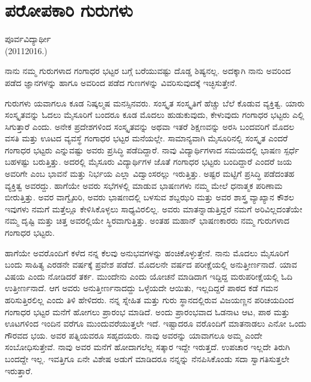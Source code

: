 {\fontsize{14}{16}\selectfont
\chapter{ಪರೋಪಕಾರಿ ಗುರುಗಳು}

\begin{center}
\smallskip
ಪೂರ್ವವಿದ್ಯಾರ್ಥೀ\\
(2011\enginline{--}2016.)
\addrule
\end{center}
ನಾನು ನಮ್ಮ ಗುರುಗಳಾದ ಗಂಗಾಧರ ಭಟ್ಟರ ಬಗ್ಗೆ ಬರೆಯುವಷ್ಟು ದೊಡ್ಡ ಶಿಷ್ಯನಲ್ಲ. ಅದಕ್ಕಾಗಿ ನಾನು ಅವರಿಂದ ಪಡೆದ ಜ್ಞಾನಗಳನ್ನು ಹಾಗೂ ಅವರಿಂದ ಪಡೆದ ಗುಣಗಳನ್ನು ವಿವರಿಸುವುದಕ್ಕೆ ಇಚ್ಛಿಸುತ್ತೇನೆ.

ಗುರುಗಳು ಯವಾಗಲೂ ಕೂಡ ನಿಷ್ಕಲ್ಮಷ ಮನಸ್ಸಿನವರು. ಸಂಸ್ಕೃತ ಸಂಸ್ಕೃತಿಗೆ ಹೆಚ್ಚು ಬೆಲೆ ಕೊಡುವ ವ್ಯಕ್ತಿತ್ವ. ಯಾರು ಸಂಸ್ಕೃತವನ್ನು ಓದಲು ಮೈಸೂರಿಗೆ ಬಂದರೂ ಕೂಡ ಮೊದಲು ಹುಡುಕುವುದು, ಕೇಳುವುದು ಗಂಗಾಧರ ಭಟ್ಟರು ಎಲ್ಲಿ ಸಿಗುತ್ತಾರೆ ಎಂದು. ಅನೇಕ ಪ್ರದೇಶಗಳಿಂದ ಸಂಸ್ಕೃತವನ್ನು ಅಥವಾ ಇತರೆ ಶಿಕ್ಷಣವನ್ನು ಅರಸಿ ಬಂದವರಿಗೆ ಮೊದಲ ವಸತಿ ಮತ್ತು ಊಟದ ವ್ಯವಸ್ಥೆ ಗಂಗಾಧರ ಭಟ್ಟರ ಮನೆಯಲ್ಲೇ. ಸಾಮಾನ್ಯವಾಗಿ ಮೈಸೂರಿನಲ್ಲಿ ಸಂಸ್ಕೃತ ಎಂದರೆ ಗಂಗಾಧರ ಭಟ್ಟರು ಎನ್ನುವಷ್ಟು ಅವರು ಪ್ರಸಿದ್ಧಿ ಪಡೆದಿದ್ದಾರೆ. ನಾವು ವಿದ್ಯಾರ್ಥಿಗಳಾದ ಸಮಯದಲ್ಲಿ ಭಾಷಣ ಸ್ಪರ್ಧೆ ಬಹಳಷ್ಟು ಬರುತ್ತಿತ್ತು. ಅದರಲ್ಲಿ ಮೈಸೂರು ವಿದ್ಯಾರ್ಥಿಗಳ ಜೊತೆ ಗಂಗಾಧರ ಭಟ್ಟರು ಬಂದಿದ್ದಾರೆ ಎಂದರೆ ಜಯ ಅವರಿಗೇ ಎಂಬ ಭಾವನೆ ಮತ್ತು ನಿರ್ಭಯ ಎಲ್ಲಾ ವಿದ್ವಾಂಸ\-ರಲ್ಲು ಇರುತ್ತಿತ್ತು. ಅಷ್ಟರ ಮಟ್ಟಿಗೆ ಪ್ರಸಿದ್ಧಿ ಪಡೆದಂತಹ ವ್ಯಕ್ತಿತ್ವ ಅವರದ್ದು. ಹಾಗೆಯೇ ಅವರು ಸಭೆಗಳಲ್ಲಿ ಮಾಡುವ ಭಾಷಣಗಳು ನಮ್ಮ ಮೇಲೆ ಧನಾತ್ಮಕ ಪರಿಣಾಮ ಬೀರುತ್ತಿತ್ತು. ಅವರ ವಾಗ್ವೈಖರಿ, ಅವರು ಭಾಷಣದಲ್ಲಿ ಬಳಸುವ ಶಬ್ದಝರಿ ಮತ್ತು ಅವರ ಶಾಸ್ತ್ರ ವ್ಯಾಖ್ಯಾನ ಕೌಶಲ  \enginline{-}   ಇವುಗಳು ನಮಗೆ ಮತ್ತೆಲ್ಲೂ ಕೇಳಿಸಿಕೊಳ್ಳಲು ಸಾಧ್ಯವಿರಲಿಲ್ಲ. ಅವರು ಮಾತನ್ನಾಡುತ್ತಿದ್ದರೆ ನಮಗೆ ಅರಿವಿಲ್ಲದಂತೆಯೇ ನಮ್ಮ ದೃಷ್ಟಿ ಮತ್ತು ಚಿತ್ತ ಅವರಲ್ಲಿಯೇ ಸ್ಥಿರವಾಗುತ್ತಿತ್ತು. ಅಂತಹ ಮಹಾನ್ ಭಾಷಣಕಾರರು ನಮ್ಮ ಗುರುಗಳಾದ ಗಂಗಾಧರ ಭಟ್ಟರು.
	
ಹಾಗೆಯೇ ಅವರೊಂದಿಗೆ ಕಳೆದ ನನ್ನ ಕೆಲವು ಅನುಭವಗಳನ್ನು ಹಂಚಿಕೊಳ್ಳುತ್ತೇನೆ. ನಾನು ಮೊದಲು ಮೈಸೂರಿಗೆ ಬಂದು ಸಾಹಿತ್ಯ ಎರಡನೇ ವರ್ಷಕ್ಕೆ ಪ್ರವೇಶ ಪಡೆದೆ. ಮೊದಲನೇ ವರ್ಷದ ಪರೀಕ್ಷೆಯಲ್ಲಿ ಅನುತ್ತೀರ್ಣನಾದೆ. ಯಾವ ವಿಷಯ ಎಂದು ನೋಡಿದರೆ ತರ್ಕ. ಮುಂದೇನು ಎಂದು ಯೋಚನೆ ಮಾಡಿದಾಗ ಇದ್ದಿದ್ದ ಮರು\-ಪರೀಕ್ಷೆಯಲ್ಲಿ ಓದಿ ಉತ್ತೀರ್ಣನಾದೆ. ಆಗ ಅವರು ಅನುತ್ತೀರ್ಣನಾದದ್ದು ಒಳ್ಳೆಯದೇ ಆಯಿತು, ಇಲ್ಲದಿದ್ದರೆ ಪಾಠದ ಕಡೆ ಗಮನ ಹರಿಸುತ್ತಿರಲಿಲ್ಲ ಎಂದು ತಿಳಿ ಹೇಳಿದರು. ನನ್ನ ಸ್ನೇಹಿತ ಮತ್ತು ಗುರು ಸ್ಥಾನದಲ್ಲಿರುವ ವಿಜಯಣ್ಣನ ಪರಿಚಯದಿಂದ ಗಂಗಾಧರ ಭಟ್ಟರ ಮನೆಗೆ ಹೋಗಲು ಪ್ರಾರಂಭ ಮಾಡಿದೆ. ಅಂದು ಪ್ರಾರಂಭವಾದ ಓಡನಾಟ ಆಟ, ಪಾಠ ಮತ್ತು ಊಟಗಳಿಂದ ಇಂದಿನ ವರೆಗೂ ಮುಂದುವರೆಯುತ್ತಲೇ ಇದೆ. ಇಷ್ಟಾದರೂ ವರೊಂದಿಗೆ ಮಾತನಾಡಲು ಎನೋ ಒಂದು ಗೌರವದ ಭಯ. ಅವರ ಪತ್ನಿಯವರೂ ಸಹೃದಯರು. ನಾವು ಅವರನ್ನು ಯಾವಾಗಲೂ ಅಮ್ಮ ಎಂದೇ ಸಂಬೋಧಿ\-ಸುತ್ತೇವೆ. ನಾವು ಅವರ ಮನೆಗೆ ಹೋದಾಗಲೆಲ್ಲ ಸತ್ಕಾರ ಇದ್ದೇ ಇರುತ್ತದೆ. ಉಪಚಾರ ಇಲ್ಲದೇ ತಿರುಗಿ ಬಂದದ್ದೇ ಇಲ್ಲ. ಇವತ್ತಿಗೂ ಏನೇ ವಿಶೇಷ ಅಡುಗೆ ಮಾಡಿದರೂ ನನ್ನನ್ನು ನೆನಪಿಸಿಕೊಂಡು ಸದಾ ಸ್ವಾಗತಿಸುತ್ತಲೇ ಇರುತ್ತಾರೆ.
	
}
